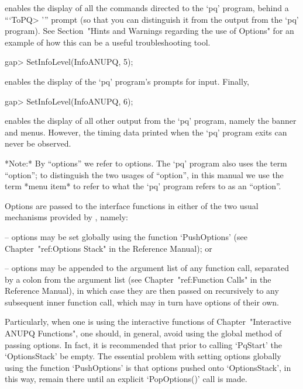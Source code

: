 enables the display of all the commands  directed  to  the  `pq'  program,
behind a ```ToPQ> ''' prompt (so that you can  distinguish  it  from  the
output from the `pq' program). See Section~"Hints and Warnings  regarding
the use of  Options"  for  an  example  of  how  this  can  be  a  useful
troubleshooting tool.

\beginexample
gap> SetInfoLevel(InfoANUPQ, 5);
\endexample

enables the display of the `pq' program's prompts for input. Finally,

\beginexample
gap> SetInfoLevel(InfoANUPQ, 6);
\endexample

enables the display of all other output from the `pq' program, namely  the
banner and menus. However, the timing data printed when the  `pq'  program
exits can never be observed.


*Note:*
By ``options'' we refer to {\GAP} options. The `pq' program also uses  the
term ``option''; to distinguish the two usages  of  ``option'',  in  this
manual we use the term *menu item* to  refer  to  what  the  `pq'  program
refers to as an ``option''.

Options are passed to the {\ANUPQ} interface functions in either  of  the
two usual mechanisms provided by {\GAP}, namely:

\beginlist%

\item{--} options may be set globally using  the  function  `PushOptions'
(see Chapter~"ref:Options Stack" in the {\GAP} Reference Manual); or

\item{--} options may be appended to the argument list  of  any  function
call,   separated   by   a   colon   from   the   argument   list    (see
Chapter~"ref:Function Calls" in the {\GAP} Reference  Manual),  in  which
case they are then passed on recursively to any subsequent inner function
call, which may in turn have options of their own.

\endlist

Particularly,  when  one  is   using   the   interactive   functions   of
Chapter~"Interactive ANUPQ Functions",  one  should,  in  general,  avoid
using the global method of passing options. In fact,  it  is  recommended
that  prior  to  calling  `PqStart'  the  `OptionsStack'  be  empty.  The
essential problem  with  setting  options  globally  using  the  function
`PushOptions' is that options pushed onto `OptionsStack',  in  this  way,
remain there until an explicit `PopOptions()' call is made.

